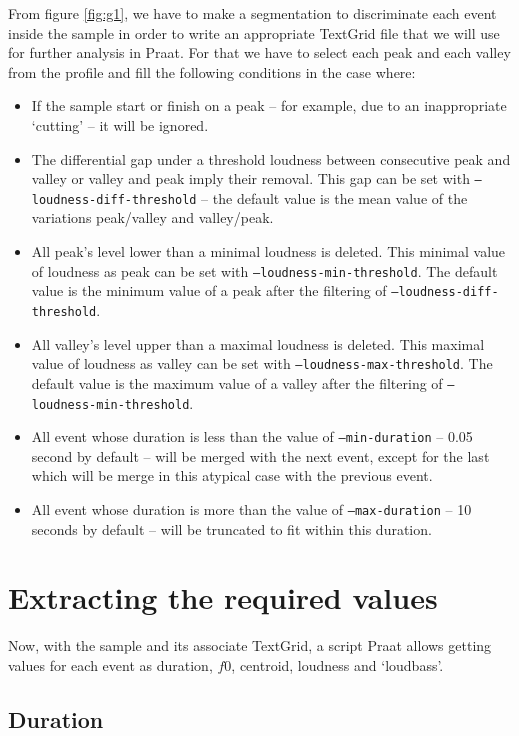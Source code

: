 From figure \ref{fig:g1}, we have to make a segmentation to discriminate each event inside the sample in order to write an appropriate TextGrid file that we will use for further analysis in Praat. For that we have to select each peak and each valley from the profile and fill the following conditions in the case where:
\begin{itemize}
\item If the sample start or finish on a peak -- for example, due to an inappropriate `cutting' -- it will be ignored.
\item The differential gap under a threshold loudness between consecutive peak and valley or valley and peak imply their removal. This gap can be set with \texttt{--loudness-diff-threshold} -- the default value is the mean value  of the variations peak/valley and valley/peak.
\item All peak's level lower than a minimal loudness is deleted. This minimal value of loudness as peak can be set with \texttt{--loudness-min-threshold}. The default value is the minimum value of a peak after the filtering of \texttt{--loudness-diff-threshold}.
\item All valley's level upper than a maximal loudness is deleted. This maximal value of loudness as valley can be set with \texttt{--loudness-max-threshold}. The default value is the maximum value of a valley after the filtering of \texttt{--loudness-min-threshold}.
\item All event whose duration is less than the value of \texttt{--min-duration} -- 0.05 second by default -- will be merged with the next event, except for the last which will be merge in this atypical case with the previous event.
\item All event whose duration is more than the value of \texttt{--max-duration} -- 10 seconds by default -- will be truncated to fit within this duration.
\end{itemize}

\section{Extracting the required values}

Now, with the sample and its associate TextGrid, a script Praat allows getting values for each event as duration, $f0$, centroid, loudness and `loudbass'.

\subsection{Duration}

